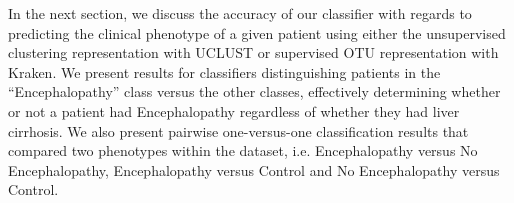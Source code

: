 In the next section, we discuss the accuracy of our 
classifier with regards to predicting the clinical 
phenotype of a given patient using 
either the unsupervised 
clustering representation with UCLUST or 
supervised OTU representation 
with Kraken. We present results for classifiers 
distinguishing patients  in the ``Encephalopathy'' class versus
the other classes, effectively 
determining whether or not a patient had Encephalopathy 
regardless of whether they had liver cirrhosis. We also 
present pairwise one-versus-one classification results that 
compared two phenotypes within the dataset, i.e.  Encephalopathy versus
No Encephalopathy, Encephalopathy versus
Control and No Encephalopathy versus Control.


